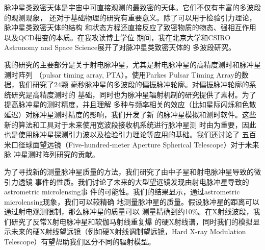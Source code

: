 
\begin{cabstract}

脉冲星类致密天体是宇宙中可直接观测的最致密的天体。它们不仅有丰富的多波段的观测现象，
还对于基础物理的研究有重要意义。除了可以用于检验引力理论，脉冲星类致密天体的结构
和状态方程还直接反应了致密物质的物态、强相互作用以及QCD相变的本质。在我攻读博士学位
期间，我在北京大学和CSIRO Astronomy and Space Science展开了对脉冲星类致密天体的
多波段研究。

我的研究的主要部分是关于射电脉冲星，尤其是射电脉冲星的高精度测时和脉冲星测时阵列
（pulsar timing array, PTA）。使用Parkes Pulsar Timing Array的数据，我们研究了24颗
毫秒脉冲星的多波段的偏振脉冲轮廓。对偏振脉冲轮廓的系统研究是高精度测时的
基础，同时也为脉冲星辐射机制的研究提供了素材。为了提高脉冲星的测时精度，并且理解
多种与频率相关的效应（比如星际闪烁和色散延迟）对脉冲星测时精度的影响，我们开发了新
的脉冲星模拟和测时软件。这些新的算法和工具对于未来使用宽波段接收机系统进行脉冲星测
时由为重要，因此也是使用脉冲星探测引力波以及检验引力理论等应用的基础。我们还讨论了
五百米口径球面望远镜（Five-hundred-meter Aperture Spherical Telescope）对于未来脉
冲星测时阵列研究的贡献。

为了寻找新的测量脉冲星质量的方法，我们研究了由中子星和射电脉冲星导致的微引力透镜
事件的性质。我们讨论了未来的大型望远镜发现由射电脉冲星导致的astrometric microlensing事
件的可能性。我们的结果显示，通过astrometric microlensing现象，我们可以较精确
地测量脉冲星的质量。假设脉冲星的距离可以通过射电观测限制，那么脉冲星的质量可以
测量精确到约10\%。在X射线波段，我们研究了反常X射电脉冲星和软伽马射线重复爆
的硬X射线谱，同时我们的模拟显示未来的硬X射线望远镜（例如硬X射线调制望远镜，Hard 
X-ray Modulation Telescope）有望帮助我们区分不同的辐射模型。
	\pkuthssffaq
\end{cabstract}

